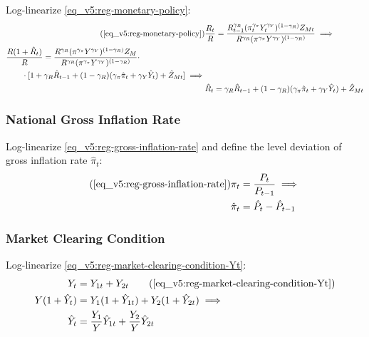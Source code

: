 \documentclass[../thesis.tex]{subfiles}
\begin{document}
Log-linearize \ref{eq_v5:reg-monetary-policy}:
\begin{align}
	\tag{\ref{eq_v5:reg-monetary-policy}}
	& \frac{R_{t}}{R} = \frac{R_{t-1}^{\gamma_R} (\pi_t^{\gamma_\pi} Y_{t}^{\gamma_Y})^{(1-\gamma_R)} Z_{Mt}}{R^{\gamma_R} (\pi^{\gamma_\pi} Y^{\gamma_Y})^{(1-\gamma_R)}} \implies \\
	\begin{split}
		& \frac{R(1+ \hat{R}_t)}{R} = \frac{ R^{\gamma_R} (\pi^{\gamma_\pi} Y^{\gamma_Y})^{(1-\gamma_R)} Z_{M}}{R^{\gamma_R} (\pi^{\gamma_\pi} Y^{\gamma_Y})^{(1-\gamma_R)}} \cdot \\
		& \qquad \cdot [1+ \gamma_R \hat{R}_{t-1} + (1-\gamma_R)(\gamma_\pi \hat{\pi}_t + \gamma_Y \hat{Y}_t) + \hat{Z}_{Mt}] \implies
	\end{split} \nonumber \\
	& \hat{R}_t = \gamma_R \hat{R}_{t-1} + (1-\gamma_R)(\gamma_\pi \hat{\pi}_t + \gamma_Y \hat{Y}_t) + \hat{Z}_{Mt} \label{eq_v5:reg-ll-monetary-policy}
\end{align}


\subsubsection*{National Gross Inflation Rate}

Log-linearize \ref{eq_v5:reg-gross-inflation-rate} and define the level deviation of gross inflation rate $\hat{\pi}_t$:
\begin{align}
	\tag{\ref{eq_v5:reg-gross-inflation-rate}}
	\pi_{t} &= \frac{P_{t}}{P_{t-1}} \implies \\
	\hat{\pi}_{t} &= \hat{P}_{t} - \hat{P}_{t-1}
	\label{eq_v5:reg-level-dev-gross-inflation-rate}
\end{align}


\subsubsection*{Market Clearing Condition}

Log-linearize \ref{eq_v5:reg-market-clearing-condition-Yt}:
\begin{alignat}{2}
	Y_{t} &= Y_{1 t} + Y_{2 t} \tag{\ref{eq_v5:reg-market-clearing-condition-Yt}} \\
	Y (1 +\hat{Y}_{t}) &= Y_{1} (1 +\hat{Y}_{1t}) + Y_{2} (1 +\hat{Y}_{2t}) \implies \nonumber \\
	\hat{Y}_{t} &= \frac{Y_{1}}{Y} \hat{Y}_{1t} + \frac{Y_{2}}{Y} \hat{Y}_{2t} \label{eq_v5:reg-ll-market-clearing-condition-Yt-2}
\end{alignat}
\end{document}

